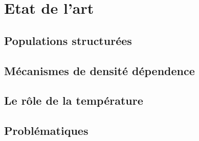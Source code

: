 \chapter{Etat de l'art}
	\section{Populations structurées}
	\section{Mécanismes de densité dépendence}
	\section{Le rôle de la température}
	\section{Problématiques}	
